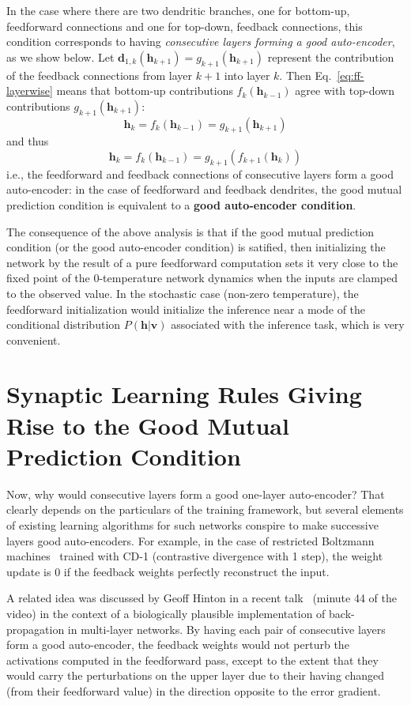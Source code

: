 \documentclass{article}
\newcommand   \vv{{\bm v}}
\newcommand   \vh{{\bm h}}
\newcommand   \vd{{\bm d}}
\begin{document}
In the case where there are two dendritic branches, one for bottom-up, feedforward connections
and one for top-down, feedback connections, this condition corresponds to having {\em consecutive layers
  forming a good auto-encoder}, as we show below. Let $\vd_{1,k}(\vh_{k+1}) = g_{k+1}(\vh_{k+1})$ represent the
contribution of the feedback connections from layer $k+1$ into layer $k$.
Then Eq.~\ref{eq:ff-layerwise} means that bottom-up contributions $f_k(\vh_{k-1})$ agree
with top-down contributions $g_{k+1}(\vh_{k+1})$:
\begin{equation}
  \vh_k = f_k(\vh_{k-1}) = g_{k+1}(\vh_{k+1})
\end{equation}
and thus
\begin{equation}
  \vh_k = f_k(\vh_{k-1}) = g_{k+1}(f_{k+1}(\vh_k))
\end{equation}
i.e., the feedforward and feedback connections of consecutive layers form a good auto-encoder:
in the case of feedforward and feedback dendrites, the good mutual prediction condition
is equivalent to a {\bf good auto-encoder condition}.

The consequence of the above analysis is that if the good mutual prediction condition
(or the good auto-encoder condition) is satified, then initializing the network
by the result of a pure feedforward computation sets it very close to the
fixed point of the 0-temperature network dynamics when the inputs are clamped to the observed value.
In the stochastic case (non-zero temperature), the feedforward initialization would
initialize the inference near a mode of the conditional distribution $P(\vh | \vv)$
associated with the inference task, which is very convenient.

\section{Synaptic Learning Rules Giving Rise to the Good Mutual Prediction Condition}

Now, why would consecutive layers form a good one-layer auto-encoder?
That clearly depends on the particulars of the training framework, but
several elements of existing learning algorithms for such networks conspire
to make successive layers good auto-encoders. For example, in the case
of restricted Boltzmann machines~\citep{Hinton06} trained with CD-1 (contrastive divergence with 1 step),
the weight update is 0 if the feedback weights perfectly reconstruct the input.

A related idea was discussed by Geoff Hinton in a recent talk~\citep{Hinton-Stanford-talk-27-04-2016}
(minute 44 of the video) in the context of a biologically plausible implementation of back-propagation
in multi-layer networks.
By having each pair of consecutive layers form a good auto-encoder, the feedback weights would not
perturb the activations computed in the feedforward pass, except to the extent that they would carry the perturbations
on the upper layer due to their having changed (from their feedforward value)
in the direction opposite to the error gradient.
\end{document}

